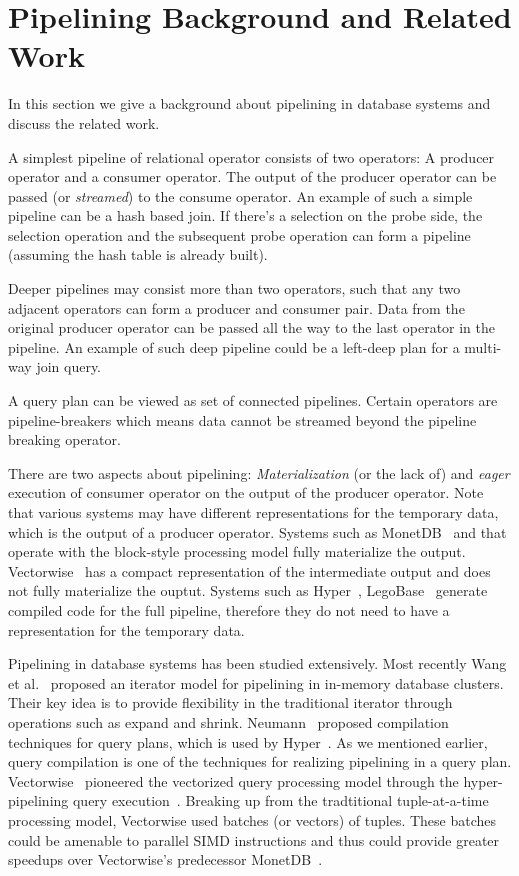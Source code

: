 \section{Pipelining Background and Related Work}\label{sec:pipe-background}
In this section we give a background about pipelining in database systems and discuss the related work. 

A simplest pipeline of relational operator consists of two operators: A producer operator and a consumer operator. 
The output of the producer operator can be passed (or \textit{streamed}) to the consume operator. 
An example of such a simple pipeline can be a hash based join. 
If there's a selection on the probe side, the selection operation and the subsequent probe operation can form a pipeline (assuming the hash table is already built).

Deeper pipelines may consist more than two operators, such that any two adjacent operators can form a producer and consumer pair.
Data from the original producer operator can be passed all the way to the last operator in the pipeline. 
An example of such deep pipeline could be a left-deep plan for a multi-way join query.

A query plan can be viewed as set of connected pipelines. 
Certain operators are pipeline-breakers which means data cannot be streamed beyond the pipeline breaking operator. 

There are two aspects about pipelining: \textit{Materialization} (or the lack of) and \textit{eager} execution of consumer operator on the output of the producer operator. 
Note that various systems may have different representations for the temporary data, which is the output of a producer operator. 
Systems such as MonetDB~\cite{monetdb} and \sys{} that operate with the block-style processing model fully materialize the output. 
Vectorwise~\cite{vectorwise} has a compact representation of the intermediate output and does not fully materialize the ouptut.
Systems such as Hyper~\cite{hyper}, LegoBase~\cite{legobase} generate compiled code for the full pipeline, therefore they do not need to have a representation for the temporary data.

Pipelining in database systems has been studied extensively. 
Most recently Wang et al.~\cite{wang2016elastic} proposed an iterator model for pipelining in in-memory database clusters.
Their key idea is to provide flexibility in the traditional iterator through operations such as expand and shrink.
Neumann~\cite{DBLP:journals/pvldb/Neumann11} proposed compilation techniques for query plans, which is used by Hyper~\cite{hyper, morsel}. 
As we mentioned earlier, query compilation is one of the techniques for realizing pipelining in a query plan. 
Vectorwise~\cite{vectorwise} pioneered the vectorized query processing model through the hyper-pipelining query execution~\cite{hyper-pipelining}.
Breaking up from the tradtitional tuple-at-a-time processing model, Vectorwise used batches (or vectors) of tuples. 
These batches could be amenable to parallel SIMD instructions and thus could provide greater speedups over Vectorwise's predecessor MonetDB~\cite{monetdb}.

